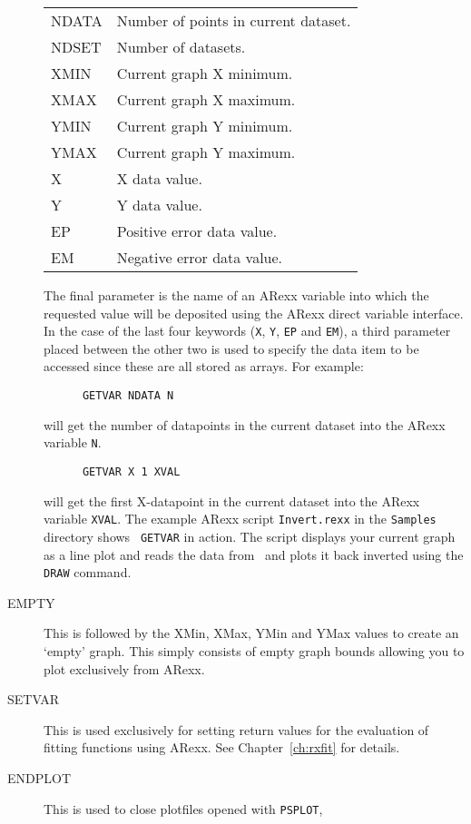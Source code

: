 \begin{description}
\begin{center}
\begin{tabular}{ll}
   NDATA & Number of points in current dataset. \\
   NDSET & Number of datasets.                  \\
   XMIN  & Current graph X minimum.             \\
   XMAX  & Current graph X maximum.             \\
   YMIN  & Current graph Y minimum.             \\
   YMAX  & Current graph Y maximum.             \\
   X     & X data value.                        \\
   Y     & Y data value.                        \\
   EP    & Positive error data value.           \\
   EM    & Negative error data value.           \\
   \end{tabular}
   \end{center}
The final parameter is the name of an ARexx variable into which the requested value 
will be deposited using the ARexx direct variable interface. In the case of the last 
four keywords ({\tt X}, {\tt Y}, {\tt EP} and {\tt EM}), a third parameter placed 
between the other two is used to specify the data item to be accessed since these 
are all stored as arrays. For example:
\begin{verbatim}
      GETVAR NDATA N
\end{verbatim}
will get the number of datapoints in the current dataset into the ARexx variable 
{\tt N}.
\begin{verbatim}
      GETVAR X 1 XVAL
\end{verbatim}
will get the first X-datapoint in the current dataset into the ARexx variable 
{\tt XVAL}.
The example ARexx script {\tt Invert.rexx} in the {\tt Samples} directory shows {\tt 
GETVAR} in action. The script displays your current graph as a line plot and reads 
the data from \amplot\ and plots it back inverted using the {\tt DRAW} command.
\item[EMPTY\dag] This is followed by the XMin, XMax, YMin and YMax values to create 
an `empty' graph. This simply consists of empty graph bounds allowing you to plot 
exclusively from ARexx.
\item[SETVAR\dag] This is used exclusively for setting return values for the 
evaluation of fitting functions using ARexx. See Chapter~\ref{ch:rxfit} for details.
\item[ENDPLOT\dag] This is used to close plotfiles opened with {\tt PSPLOT}, {\tt 
}
\end{description}
